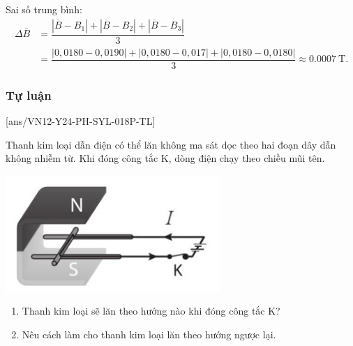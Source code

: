 \begin{ex}
{\begin{center}
\begin{tabular}{|M{2cm}|M{2cm}|M{2cm}|M{2cm}|M{4cm}|M{3.5cm}|}
			\end{tabular}
		\end{center}	
		Sai số trung bình:
		$$\begin{aligned}
			\Delta \overline{B}&=\dfrac{\left|\overline{B}-B_1\right|+\left|\overline{B}-B_2\right|+\left|\overline{B}-B_3\right|}{3}\\
			&=\dfrac{\left|0,0180-0,0190\right|+\left|0,0180-0,017\right|+\left|0,0180-0,0180\right|}{3}\approx\SI{0.0007}{\tesla}.
		\end{aligned}$$
		
	}
\end{ex}



\subsubsection{Tự luận}
\setcounter{ex}{0}
[ans/VN12-Y24-PH-SYL-018P-TL]
\begin{ex}
	Thanh kim loại dẫn điện có thể lăn không ma sát dọc theo hai đoạn dây dẫn không nhiễm từ. Khi đóng công tắc K, dòng điện chạy theo chiều mũi tên.
	\begin{center}
		\includegraphics[width=0.3\linewidth]{figs/VN12-Y24-PH-SYL-018P-8}
	\end{center}
	\begin{enumerate}[label=\alph*)]
		\item Thanh kim loại sẽ lăn theo hướng nào khi đóng công tắc K?
		\item Nêu cách làm cho thanh kim loại lăn theo hướng ngược lại.
	\end{enumerate}
\end{ex}

